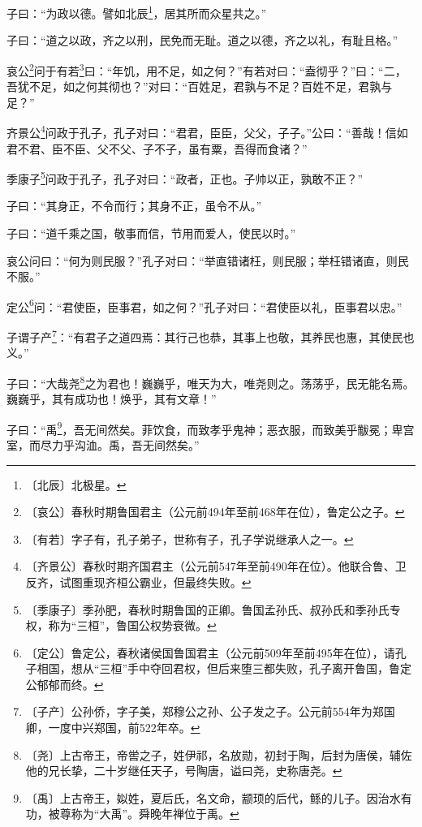 \documentclass[12pt,UTF-8,openany,a4]{ctexbook}
\begin{document}
\begin{large}
    
    子曰：“为政以德。譬如北辰\footnote{〔北辰〕\yiwen 北极星。}，居其所而众星共之。”
    
    子曰：“道之以政，齐之以刑，民免而无耻。道之以德，齐之以礼，有耻且格。”
    
    哀公\footnote{〔哀公〕\yiwen 春秋时期鲁国君主（公元前494年至前468年在位），鲁定公之子。}问于有若\footnote{〔有若〕\yiwen 字子有，孔子弟子，世称有子，孔子学说继承人之一。}曰：“年饥，用不足，如之何？”有若对曰：“盍彻乎？”曰：“二，吾犹不足，如之何其彻也？”对曰：“百姓足，君孰与不足？百姓不足，君孰与足？”
    
    齐景公\footnote{〔齐景公〕\yiwen 春秋时期齐国君主（公元前547年至前490年在位）。他联合鲁、卫反齐，试图重现齐桓公霸业，但最终失败。}问政于孔子，孔子对曰：“君君，臣臣，父父，子子。”公曰：“善哉！信如君不君、臣不臣、父不父、子不子，虽有粟，吾得而食诸？”
    
    季康子\footnote{〔季康子〕\yiwen 季孙肥，春秋时期鲁国的正卿。鲁国孟孙氏、叔孙氏和季孙氏专权，称为“三桓”，鲁国公权势衰微。}问政于孔子，孔子对曰：“政者，正也。子帅以正，孰敢不正？”
    
    子曰：“其身正，不令而行；其身不正，虽令不从。”
    
    子曰：“道千乘之国，敬事而信，节用而爱人，使民以时。”
    
    哀公问曰：“何为则民服？”孔子对曰：“举直错诸枉，则民服；举枉错诸直，则民不服。”
    
    定公\footnote{〔定公〕\yiwen 鲁定公，春秋诸侯国鲁国君主（公元前509年至前495年在位），请孔子相国，想从“三桓”手中夺回君权，但后来堕三都失败，孔子离开鲁国，鲁定公郁郁而终。}问：“君使臣，臣事君，如之何？”孔子对曰：“君使臣以礼，臣事君以忠。”
    
    子谓子产\footnote{〔子产〕\yiwen 公孙侨，字子美，郑穆公之孙、公子发之子。公元前554年为郑国卿，一度中兴郑国，前522年卒。}：“有君子之道四焉：其行己也恭，其事上也敬，其养民也惠，其使民也义。”
    
    子曰：“大哉尧\footnote{〔尧〕\yiwen 上古帝王，帝喾之子，姓伊祁，名放勋，初封于陶，后封为唐侯，辅佐他的兄长挚，二十岁继任天子，号陶唐，谥曰尧，史称唐尧。}之为君也！巍巍乎，唯天为大，唯尧则之。荡荡乎，民无能名焉。巍巍乎，其有成功也！焕乎，其有文章！”
    
    子曰：“禹\footnote{〔禹〕\yiwen 上古帝王，姒姓，夏后氏，名文命，颛顼的后代，鲧的儿子。因治水有功，被尊称为“大禹”。舜晚年禅位于禹。}，吾无间然矣。菲饮食，而致孝乎鬼神；恶衣服，而致美乎黻冕；卑宫室，而尽力乎沟洫。禹，吾无间然矣。”

\end{large}
\end{document}
